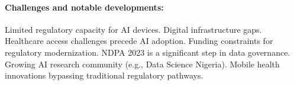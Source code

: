 {\paragraph{Challenges and notable developments:}
Limited regulatory capacity for AI devices. Digital infrastructure gaps. Healthcare access challenges precede AI adoption. Funding constraints for regulatory modernization.
NDPA 2023 is a significant step in data governance. Growing AI research community (e.g., Data Science Nigeria). Mobile health innovations bypassing traditional regulatory pathways.

} %


